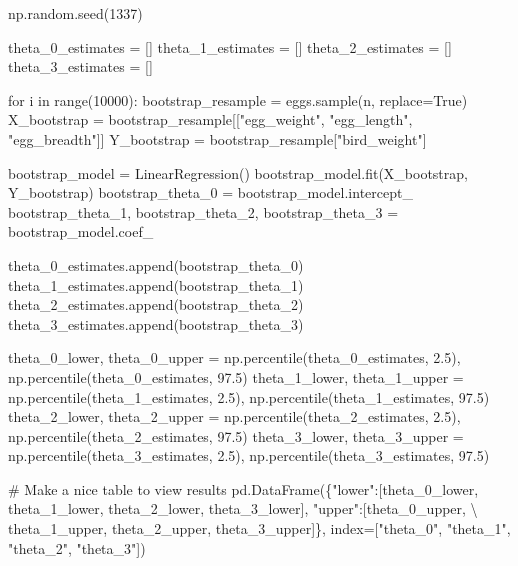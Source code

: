 \documentclass[
  letterpaper,
  DIV=11,
  numbers=noendperiod]{scrreprt}
\newenvironment{Shaded}{\begin{snugshade}}{\end{snugshade}}
\newcommand{\BuiltInTok}[1]{\textcolor[rgb]{0.00,0.23,0.31}{#1}}
\newcommand{\CommentTok}[1]{\textcolor[rgb]{0.37,0.37,0.37}{#1}}
\newcommand{\ControlFlowTok}[1]{\textcolor[rgb]{0.00,0.23,0.31}{#1}}
\newcommand{\DecValTok}[1]{\textcolor[rgb]{0.68,0.00,0.00}{#1}}
\newcommand{\FloatTok}[1]{\textcolor[rgb]{0.68,0.00,0.00}{#1}}
\newcommand{\KeywordTok}[1]{\textcolor[rgb]{0.00,0.23,0.31}{#1}}
\newcommand{\NormalTok}[1]{\textcolor[rgb]{0.00,0.23,0.31}{#1}}
\newcommand{\OperatorTok}[1]{\textcolor[rgb]{0.37,0.37,0.37}{#1}}
\newcommand{\StringTok}[1]{\textcolor[rgb]{0.13,0.47,0.30}{#1}}
\newcommand{\VariableTok}[1]{\textcolor[rgb]{0.07,0.07,0.07}{#1}}
\begin{document}
\begin{Shaded}
\begin{Highlighting}[]
\NormalTok{np.random.seed(}\DecValTok{1337}\NormalTok{)}

\NormalTok{theta\_0\_estimates }\OperatorTok{=}\NormalTok{ []}
\NormalTok{theta\_1\_estimates }\OperatorTok{=}\NormalTok{ []}
\NormalTok{theta\_2\_estimates }\OperatorTok{=}\NormalTok{ []}
\NormalTok{theta\_3\_estimates }\OperatorTok{=}\NormalTok{ []}


\ControlFlowTok{for}\NormalTok{ i }\KeywordTok{in} \BuiltInTok{range}\NormalTok{(}\DecValTok{10000}\NormalTok{):}
\NormalTok{    bootstrap\_resample }\OperatorTok{=}\NormalTok{ eggs.sample(n, replace}\OperatorTok{=}\VariableTok{True}\NormalTok{)}
\NormalTok{    X\_bootstrap }\OperatorTok{=}\NormalTok{ bootstrap\_resample[[}\StringTok{"egg\_weight"}\NormalTok{, }\StringTok{"egg\_length"}\NormalTok{, }\StringTok{"egg\_breadth"}\NormalTok{]]}
\NormalTok{    Y\_bootstrap }\OperatorTok{=}\NormalTok{ bootstrap\_resample[}\StringTok{"bird\_weight"}\NormalTok{]}
    
\NormalTok{    bootstrap\_model }\OperatorTok{=}\NormalTok{ LinearRegression()}
\NormalTok{    bootstrap\_model.fit(X\_bootstrap, Y\_bootstrap)}
\NormalTok{    bootstrap\_theta\_0 }\OperatorTok{=}\NormalTok{ bootstrap\_model.intercept\_}
\NormalTok{    bootstrap\_theta\_1, bootstrap\_theta\_2, bootstrap\_theta\_3 }\OperatorTok{=}\NormalTok{ bootstrap\_model.coef\_}
    
\NormalTok{    theta\_0\_estimates.append(bootstrap\_theta\_0)}
\NormalTok{    theta\_1\_estimates.append(bootstrap\_theta\_1)}
\NormalTok{    theta\_2\_estimates.append(bootstrap\_theta\_2)}
\NormalTok{    theta\_3\_estimates.append(bootstrap\_theta\_3)}
    
\NormalTok{theta\_0\_lower, theta\_0\_upper }\OperatorTok{=}\NormalTok{ np.percentile(theta\_0\_estimates, }\FloatTok{2.5}\NormalTok{), np.percentile(theta\_0\_estimates, }\FloatTok{97.5}\NormalTok{)}
\NormalTok{theta\_1\_lower, theta\_1\_upper }\OperatorTok{=}\NormalTok{ np.percentile(theta\_1\_estimates, }\FloatTok{2.5}\NormalTok{), np.percentile(theta\_1\_estimates, }\FloatTok{97.5}\NormalTok{)}
\NormalTok{theta\_2\_lower, theta\_2\_upper }\OperatorTok{=}\NormalTok{ np.percentile(theta\_2\_estimates, }\FloatTok{2.5}\NormalTok{), np.percentile(theta\_2\_estimates, }\FloatTok{97.5}\NormalTok{)}
\NormalTok{theta\_3\_lower, theta\_3\_upper }\OperatorTok{=}\NormalTok{ np.percentile(theta\_3\_estimates, }\FloatTok{2.5}\NormalTok{), np.percentile(theta\_3\_estimates, }\FloatTok{97.5}\NormalTok{)}

\CommentTok{\# Make a nice table to view results}
\NormalTok{pd.DataFrame(\{}\StringTok{"lower"}\NormalTok{:[theta\_0\_lower, theta\_1\_lower, theta\_2\_lower, theta\_3\_lower], }\StringTok{"upper"}\NormalTok{:[theta\_0\_upper, }\OperatorTok{\textbackslash{}}
\NormalTok{                theta\_1\_upper, theta\_2\_upper, theta\_3\_upper]\}, index}\OperatorTok{=}\NormalTok{[}\StringTok{"theta\_0"}\NormalTok{, }\StringTok{"theta\_1"}\NormalTok{, }\StringTok{"theta\_2"}\NormalTok{, }\StringTok{"theta\_3"}\NormalTok{])}
\end{Highlighting}
\end{Shaded}
\end{document}
